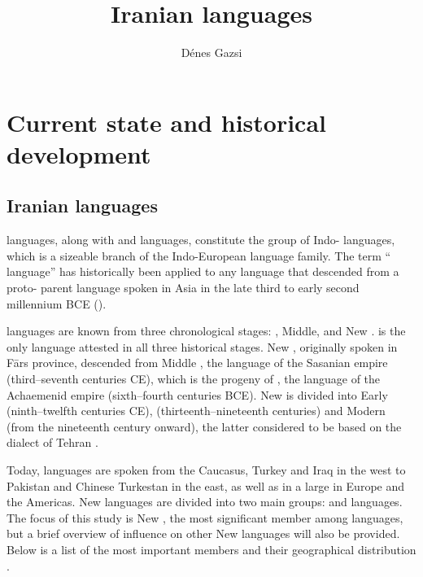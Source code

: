 \documentclass[output=paper]{langsci/langscibook}
\author{Dénes Gazsi}
\title{Iranian languages}
\begin{document}
\maketitle

\section{Current state and historical development}

\subsection{Iranian languages}

 languages, along with  and  languages, constitute the group of Indo- languages, which is a sizeable branch of the Indo-European language family. The term `` language'' has historically been applied to any language that descended from a proto- parent language spoken in  Asia in the late third to early second millennium BCE (\citealt{Skjærvø2012}).

 languages are known from three chronological stages: , Middle, and New .  is the only language attested in all three historical stages. New , originally spoken in Fārs province, descended from Middle , the language of the Sasanian empire (third–seventh centuries CE), which is the progeny of  , the language of the Achaemenid empire (sixth–fourth centuries BCE). New  is divided into Early  (ninth–twelfth centuries CE),  (thirteenth–nineteenth centuries) and Modern  (from the nineteenth century onward), the latter considered to be based on the dialect of Tehran \citep[427]{Jeremiás2003}.

Today,  languages are spoken from the Caucasus, Turkey and Iraq in the west to Pakistan and Chinese Turkestan in the east, as well as in a large  in Europe and the Americas. New  languages are divided into two main groups:  and   languages. The focus of this study is New , the most significant member among  languages, but a brief overview of  influence on other New  languages will also be provided. Below is a list of the most important members and their geographical distribution \citep[246]{Schmitt1989}.
\end{document}
